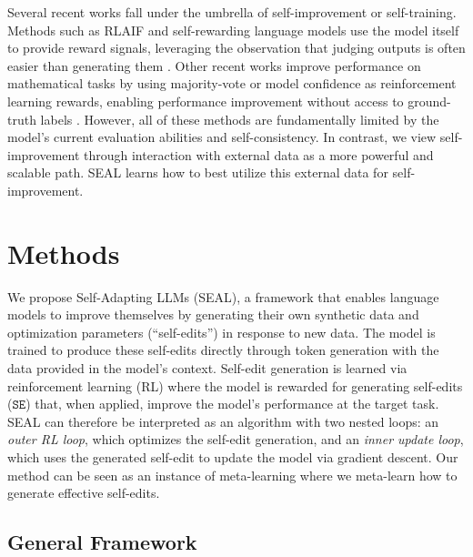 \documentclass{article}
\newcommand{\methodname}{Self-Adapting LLMs (SEAL)\xspace}
\newcommand{\methodacronym}{SEAL\xspace}
\begin{document}
Several recent works fall under the umbrella of self-improvement or self-training. Methods such as RLAIF \citep{bai2022constitutionalaiharmlessnessai, lee2024rlaif} and self-rewarding language models \citep{pang2024selfimprove, wang2025cream} use the model itself to provide reward signals, leveraging the observation that judging outputs is often easier than generating them \citep{song2025mind}. Other recent works improve performance on mathematical tasks by using majority-vote or model confidence as reinforcement learning rewards, enabling performance improvement without access to ground-truth labels \citep{huang2023selfimprove, prasad2024selfconsistencypreferenceoptimization, huang2025self, zuo2025ttrltesttimereinforcementlearning, shafayat2025largereasoningmodelsselftrain}. However, all of these methods are fundamentally limited by the model's current evaluation abilities and self-consistency. In contrast, we view self-improvement through interaction with external data as a more powerful and scalable path. \methodacronym learns how to best utilize this external data for self-improvement.

\section{Methods}
\label{sec:methods}

We propose \methodname, a framework that enables language models to improve themselves by generating their own synthetic data and optimization parameters (``self-edits'') in response to new data. The model is trained to produce these self-edits directly through token generation with the data provided in the model's context. Self-edit generation is learned via reinforcement learning (RL) where the model is rewarded for generating self-edits ($\texttt{SE}$) that, when applied, improve the model's performance at the target task. \methodacronym{} can therefore be interpreted as an algorithm with two nested loops: an \textit{outer RL loop}, which optimizes the self-edit generation, and an \textit{inner update loop}, which uses the generated self-edit to update the model via gradient descent. Our method can be seen as an instance of meta-learning where we meta-learn how to generate effective self-edits. 

\subsection{General Framework}
\end{document}
